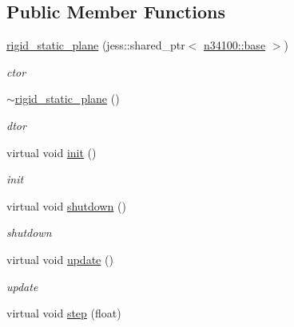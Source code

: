 \subsection*{Public Member Functions}
\begin{DoxyCompactItemize}
\item 
\hyperlink{classnebula_1_1content_1_1actor_1_1physics_1_1rigid__static__plane_ad45cff77846da49496d5025f483fd1ce}{rigid\_\-static\_\-plane} (jess::shared\_\-ptr$<$ \hyperlink{classnebula_1_1content_1_1actor_1_1admin_1_1base}{n34100::base} $>$)
\begin{DoxyCompactList}\small\item\em ctor \item\end{DoxyCompactList}\item 
\hyperlink{classnebula_1_1content_1_1actor_1_1physics_1_1rigid__static__plane_a961a69e85f5169130857f5ad9dd135fd}{$\sim$rigid\_\-static\_\-plane} ()
\begin{DoxyCompactList}\small\item\em dtor \item\end{DoxyCompactList}\item 
virtual void \hyperlink{classnebula_1_1content_1_1actor_1_1physics_1_1rigid__static__plane_ae7e418de928a5830a9e088bb843c95f0}{init} ()
\begin{DoxyCompactList}\small\item\em init \item\end{DoxyCompactList}\item 
virtual void \hyperlink{classnebula_1_1content_1_1actor_1_1physics_1_1rigid__static__plane_a2ccd43a02a417f4690bc9174e4bf533a}{shutdown} ()
\begin{DoxyCompactList}\small\item\em shutdown \item\end{DoxyCompactList}\item 
virtual void \hyperlink{classnebula_1_1content_1_1actor_1_1physics_1_1rigid__static__plane_ab42f682ba60457dc596613690b57517e}{update} ()
\begin{DoxyCompactList}\small\item\em update \item\end{DoxyCompactList}\item 
virtual void \hyperlink{classnebula_1_1content_1_1actor_1_1physics_1_1rigid__static__plane_aeb2d9144ad76f92c6170bbc5ad81c2d6}{step} (float)

\end{DoxyCompactItemize}
